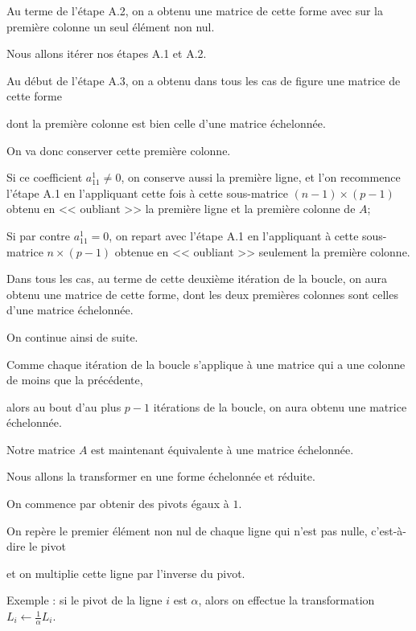 \change
Au terme de l'étape A.2, on a obtenu une matrice de cette forme
avec sur la première colonne un seul élément non nul.


\diapo

Nous allons itérer nos étapes A.1 et A.2.

\change
Au début de l'étape A.3, on a obtenu dans tous les cas de figure une matrice de cette forme


\change
dont la première colonne est bien celle d'une matrice échelonnée. 

On va donc conserver cette première colonne. 

\change
Si ce coefficient $a^1_{11}\neq0$, 
on conserve aussi la première ligne, et l'on recommence l'étape A.1 
en l'appliquant cette fois à cette sous-matrice $(n-1)\times(p-1)$ 
obtenu en << oubliant >> la première ligne et la première colonne de $A$;

\change
Si par contre $a^1_{11}=0$, on repart avec l'étape A.1 en l'appliquant à cette sous-matrice 
$n\times(p-1)$ obtenue en << oubliant >> seulement la première colonne.


\change
Dans tous les cas, au terme de cette deuxième itération de la boucle, on aura obtenu une matrice de cette forme, dont les deux premières colonnes sont celles d'une matrice échelonnée. 


\change
On continue ainsi de suite.

Comme chaque itération de la boucle s'applique à une matrice qui a 
une colonne de moins que la précédente, 

\change
alors au bout d'au plus $p-1$ itérations de la boucle, on aura obtenu une 
matrice échelonnée.


\diapo

Notre matrice $A$ est maintenant équivalente à une matrice échelonnée.

Nous allons la transformer en une forme échelonnée et réduite.

\change
On commence par obtenir des pivots égaux à $1$.

\change
On repère le premier élément non nul de chaque ligne qui n'est pas nulle, c'est-à-dire le pivot

\change
et on multiplie cette ligne par l'inverse du pivot. 

\change
Exemple : si le pivot de la ligne $i$ est $\alpha$, alors
on effectue la transformation $L_i \leftarrow \frac1\alpha L_i$.

